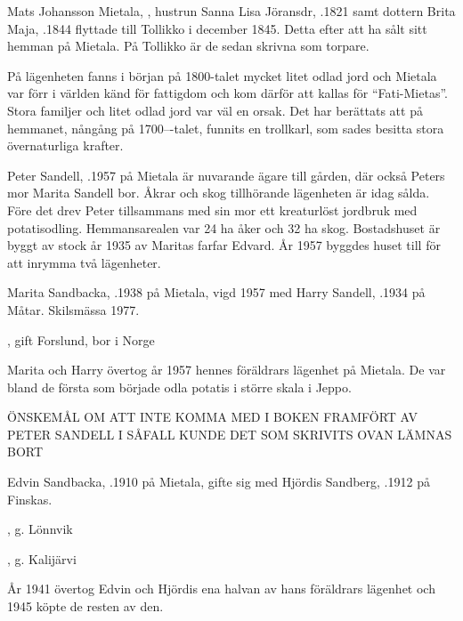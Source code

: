 Mats Johansson Mietala, , hustrun Sanna Lisa Jöransdr, .1821 samt dottern Brita Maja,  .1844 flyttade till Tollikko i december 1845. Detta efter att ha sålt sitt hemman på Mietala. På Tollikko är de sedan skrivna som torpare.

På lägenheten fanns i början på 1800-talet mycket litet odlad jord och Mietala var förr i världen känd för fattigdom och kom därför att kallas för ``Fati-Mietas''. Stora familjer och litet odlad jord var väl en orsak. Det har berättats att på hemmanet, nångång på 1700---talet, funnits en trollkarl, som sades besitta stora övernaturliga krafter.





Peter Sandell, .1957 på Mietala är nuvarande ägare till gården, där också Peters mor Marita Sandell bor. Åkrar och skog tillhörande lägenheten är idag sålda. Före det drev Peter tillsammans med sin mor ett kreaturlöst jordbruk med potatisodling. Hemmansarealen var 24 ha åker och 32 ha skog. Bostadshuset är byggt av stock år 1935 av Maritas farfar Edvard. År 1957 byggdes huset till för att inrymma två lägenheter.


Marita  Sandbacka, .1938 på Mietala, vigd 1957 med Harry Sandell, .1934 på Måtar. Skilsmässa 1977.
\begin{jhchildren}
  \item {}
  \item {}, gift Forslund, bor i Norge
\end{jhchildren}
Marita och Harry övertog år 1957 hennes föräldrars lägenhet på Mietala. De var bland de första som började odla potatis i större skala i Jeppo.

ÖNSKEMÅL OM ATT INTE KOMMA MED I BOKEN FRAMFÖRT AV PETER SANDELL I SÅFALL KUNDE  DET SOM SKRIVITS OVAN LÄMNAS BORT

Edvin Sandbacka, .1910 på Mietala, gifte sig med Hjördis Sandberg, .1912 på Finskas.
\begin{jhchildren}
  \item {}, g. Lönnvik
  \item {}
  \item {}, g. Kalijärvi
\end{jhchildren}
År 1941 övertog Edvin och Hjördis ena halvan av hans föräldrars lägenhet och 1945 köpte de resten av den.

